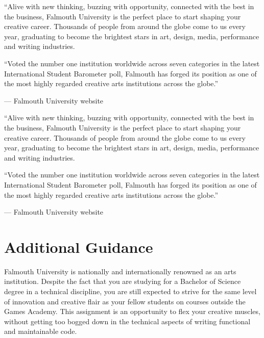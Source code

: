 \documentclass{../fal_assignment}
\begin{document}
\begin{marginquote}
    ``Alive with new thinking, buzzing with opportunity, connected with the best in the business,
    Falmouth University is the perfect place to start shaping your creative career.
    Thousands of people from around the globe come to us every year,
    graduating to become the brightest stars in art, design, media, performance and writing industries.

    ``Voted the number one institution worldwide across seven categories in the latest International Student Barometer poll,
    Falmouth has forged its position as one of the most highly regarded creative arts institutions across the globe.''
    
    --- Falmouth University website
\end{marginquote}
\clearpage
\begin{marginquote}
    ``Alive with new thinking, buzzing with opportunity, connected with the best in the business,
    Falmouth University is the perfect place to start shaping your creative career.
    Thousands of people from around the globe come to us every year,
    graduating to become the brightest stars in art, design, media, performance and writing industries.

    ``Voted the number one institution worldwide across seven categories in the latest International Student Barometer poll,
    Falmouth has forged its position as one of the most highly regarded creative arts institutions across the globe.''
    
    --- Falmouth University website
\end{marginquote}
\section*{Additional Guidance}

Falmouth University is nationally and internationally renowned as an arts institution.
Despite the fact that you are studying for a Bachelor of Science degree in a technical discipline,
you are still expected to strive for the same level of innovation and creative flair
as your fellow students on courses outside the Games Academy.
This assignment is an opportunity to flex your creative muscles, without getting too bogged down
in the technical aspects of writing functional and maintainable code.
\end{document}
